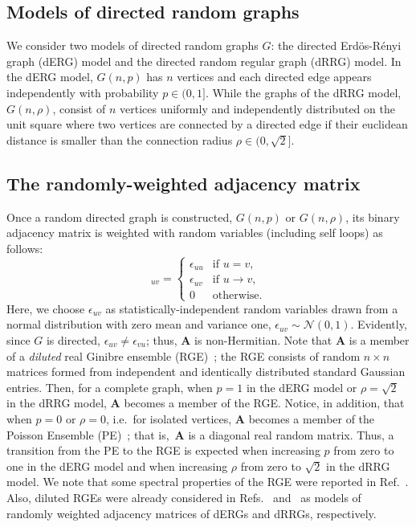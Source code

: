 \subsection{Models of directed random graphs}

We consider two models of directed random graphs $G$:
the directed Erd\"os-R\'enyi graph (dERG) model and the directed random regular graph (dRRG) model.
In the dERG model, $G(n,p)$ has $n$ vertices and each directed edge appears independently 
with probability $p \in (0,1]$.
While the graphs of the dRRG model, $G(n,\rho)$, consist of $n$ vertices uniformly and independently 
distributed on the unit square where two vertices are connected by a directed edge if their euclidean 
distance is smaller than the connection radius $\rho \in (0,\sqrt{2}]$.


\subsection{The randomly-weighted adjacency matrix}

Once a random directed graph is constructed, $G(n,p)$ or $G(n,\rho)$, its binary adjacency matrix is 
weighted with random variables (including self loops) as follows:
\begin{equation}
[\mathbf{A}]_{uv}=\left\{
\begin{array}{ll}
\epsilon_{uu} & \mbox{if $u=v$}, \\
\epsilon_{uv} & \mbox{if $u\rightarrow v$}, \\
0 & \mbox{otherwise}.
\end{array}
\right.
\label{A}
\end{equation}
Here, we choose $\epsilon_{uv}$ as statistically-independent random variables drawn from a 
normal distribution with zero mean and variance one, $\epsilon_{uv}\sim\mathcal {N}(0, 1)$. 
Evidently, since $G$ is directed, $\epsilon_{uv}\ne \epsilon_{vu}$; thus, $\mathbf{A}$ is non-Hermitian.
Note that $\mathbf{A}$ is a member of a {\it diluted} real Ginibre ensemble (RGE)~\cite{G65};
the RGE consists of random $n\times n$ matrices formed from independent and identically distributed 
standard Gaussian entries. Then, for a complete graph, when $p=1$ in the dERG model or 
$\rho=\sqrt{2}$ in the dRRG model, $\mathbf{A}$ becomes a member of the RGE. 
Notice, in addition, that when $p=0$ or $\rho=0$, i.e.~for isolated vertices, $\mathbf{A}$ becomes 
a member of the Poisson Ensemble (PE)~\cite{M04}; that is,~$\mathbf{A}$ is a diagonal real random 
matrix. Thus, a transition from the PE to the RGE is expected when increasing $p$ from zero to 
one in the dERG model and when increasing $\rho$ from zero to $\sqrt{2}$ in the dRRG model.
We note that some spectral properties of the RGE were reported in Ref.~\cite{FN07}. 
Also, diluted RGEs were already considered in Refs.~\cite{PRRCM20} and~\cite{PM23} as models 
of randomly weighted adjacency matrices of dERGs and dRRGs, respectively.



